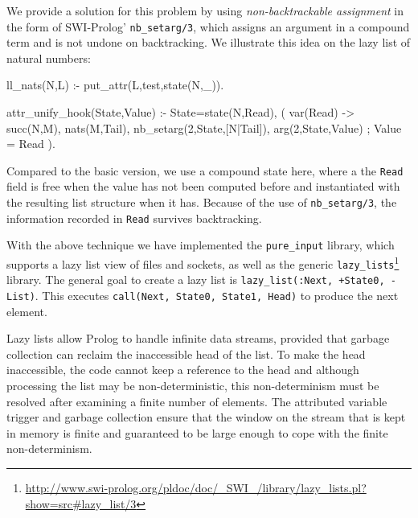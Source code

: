 \documentclass{new_tlp}
\begin{document}
We provide a solution for this problem by using \emph{non-backtrackable
assignment} in the form of SWI-Prolog' \texttt{nb\_setarg/3}, which assigns an
argument in a compound term and is not undone on backtracking. We illustrate this
idea on the lazy list of natural numbers:
\begin{code}
ll_nats(N,L) :- put_attr(L,test,state(N,_)).

attr_unify_hook(State,Value) :-
  State=state(N,Read),
  ( var(Read) ->
      succ(N,M),
      nats(M,Tail),
      nb_setarg(2,State,[N|Tail]),
      arg(2,State,Value)
  ;
      Value = Read
  ).
\end{code}
Compared to the basic version, we use a compound state here, where a
the \texttt{Read} field is free when the value has not been computed before
and instantiated with the resulting list structure when it has. Because
of the use of {\tt nb\_setarg/3}, the information recorded in \texttt{Read}
survives backtracking.

With the above technique we have implemented the \texttt{pure\_input} library, which supports a lazy list view of files and sockets, 
as well as the generic
\texttt{lazy\_lists}\footnote{\url{http://www.swi-prolog.org/pldoc/doc/_SWI_/library/lazy_lists.pl?show=src\#lazy_list/3}}
library. The general goal to create a lazy list is
\texttt{lazy\_list(:Next, +State0, -List)}. This executes
\texttt{call(Next, State0, State1, Head)} to produce the next element.

Lazy lists allow Prolog to handle infinite data streams, provided that garbage
collection can reclaim the inaccessible head of the list. To make the
head inaccessible, the code cannot keep a reference to the head
and although processing the list may be non-deterministic,
this non-determinism must be resolved after examining a finite number of
elements.  The attributed variable trigger and garbage collection ensure
that the window on the stream that is kept in memory is finite and
guaranteed to be large enough to cope with the finite non-determinism.


% 


\end{document}
